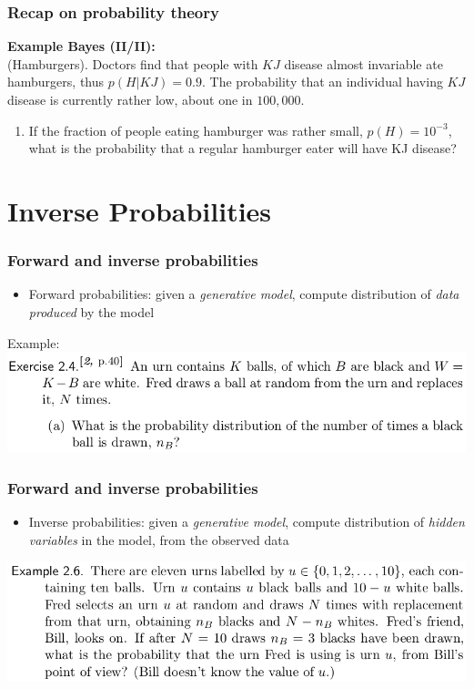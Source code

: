 \documentclass{beamer}
\begin{document}
\begin{frame}
	\frametitle{Recap on probability theory}
    \textbf{Example Bayes (II/II):}\\
  	(Hamburgers). Doctors find that people with $KJ$ disease almost invariable ate hamburgers, thus $p(H|KJ)=0.9$.
	The probability that an individual having $KJ$ disease is currently rather low, about one in $100,000$.
	\begin{enumerate}
\item If the fraction of people eating hamburger was rather small, $p(H)=10^{-3}$, what is the probability that a regular hamburger eater will have KJ disease?
	\end{enumerate}
\end{frame}

\fi

\section{Inverse Probabilities}

\begin{frame}
	\frametitle{Forward and inverse probabilities}
	\begin{itemize}
	\item Forward probabilities: given a \emph{generative model}, compute distribution of \emph{data produced} by the model  
	\end{itemize}
Example:\\
\includegraphics[width=\textwidth]{e5}

\end{frame}


\begin{frame}
	\frametitle{Forward and inverse probabilities}

	\begin{itemize}
	\item Inverse probabilities: given a \emph{generative model}, compute distribution of \emph{hidden variables} in the model, from the observed data  
	\end{itemize}
\includegraphics[width=\textwidth]{e6}
\end{frame}
\end{document}
